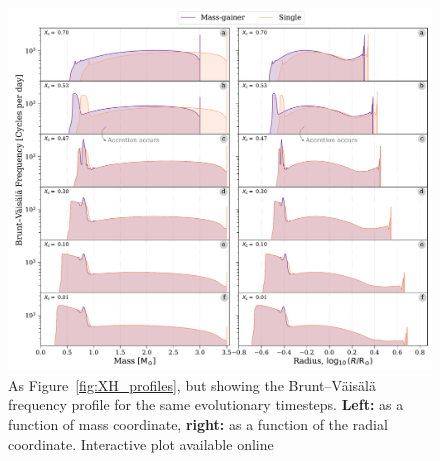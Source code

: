 \documentclass[desactivate]{aa}
\begin{document}
\begin{figure}
    \centering
    \includegraphics[width=\textwidth]{figures/BV_profile_all_combo.pdf}
    \caption{As Figure~\ref{fig:XH_profiles}, but showing the Brunt–Väisälä frequency profile for the same evolutionary timesteps. \textbf{Left:} as a function of mass coordinate, \textbf{right:} as a function of the radial coordinate. Interactive plot available online \href{www.tomwagg.com/html/interact/mass-gainer-asteroseismology.html\#fig2-4}{\faChartArea}}
    \label{fig:BV_profiles}
\end{figure}
\end{document}
